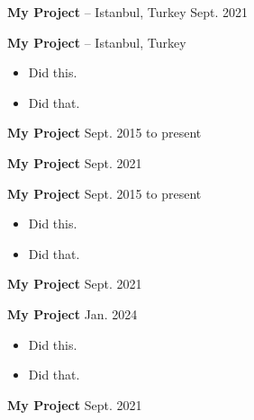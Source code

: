 \documentclass[10pt, letterpaper]{article}
\newenvironment{highlights}{
        \begin{itemize}[
                topsep=0pt,
                partopsep=0pt,
                itemsep=0pt,
                leftmargin=10pt
            ]
    }{
        \end{itemize}
    } %
\begin{document}
        \vspace{8pt}

        \textbf{My Project} -- Istanbul, Turkey \hfill Sept. 2021



        \vspace{8pt}

        \textbf{My Project} -- Istanbul, Turkey \hfill 

        \begin{highlights}
        \item Did this.
        \item Did that.
        \end{highlights}


        \vspace{8pt}

        \textbf{My Project} \hfill Sept. 2015 to present



        \vspace{8pt}

        \textbf{My Project} \hfill Sept. 2021



        \vspace{8pt}

        \textbf{My Project} \hfill Sept. 2015 to present

        \begin{highlights}
        \item Did this.
        \item Did that.
        \end{highlights}


        \vspace{8pt}

        \textbf{My Project} \hfill Sept. 2021



        \vspace{8pt}

        \textbf{My Project} \hfill Jan. 2024

        \begin{highlights}
        \item Did this.
        \item Did that.
        \end{highlights}


        \vspace{8pt}

        \textbf{My Project} \hfill Sept. 2021
\end{document}
